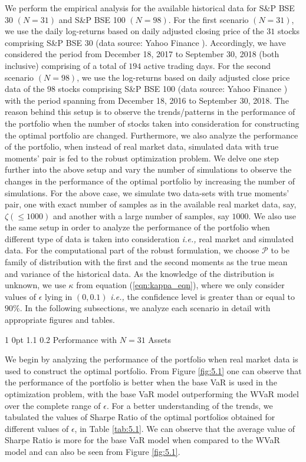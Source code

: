 \documentclass[12pt]{article}
\makeatletter
\numberwithin{equation}{section}
\renewcommand{\subsubsection}{
  \@startsection
  {subsubsection}%
  {1}%
  {0pt}%
  {1.1\baselineskip}%
  {0.2\baselineskip}%
  {\sc \centering}%
}
\makeatother
\begin{document}
We perform the empirical analysis for the available historical data for S\&P BSE 30 $(N=31)$ and S\&P BSE 100 $(N=98)$. For the first scenario $(N=31)$,
we use the daily log-returns based on daily adjusted closing price of the $31$ stocks comprising S\&P BSE 30 (data source: Yahoo Finance \cite{yf}).
Accordingly, we have considered the period from December 18, 2017 to September 30, 2018 (both inclusive) comprising of a total of $194$ active trading days.
For the second scenario $(N=98)$, we use the log-returns based on daily adjusted close price data of the $98$ stocks comprising S\&P BSE 100
(data source: Yahoo Finance \cite{yf}) with the period spanning from December 18, 2016 to September 30, 2018. The reason behind this setup is to observe the trends/patterns in the performance of the portfolio when the number of stocks taken into consideration for constructing the optimal portfolio are changed. Furthermore, we also analyze the performance of the portfolio, when instead of real market data, simulated data with true moments' pair is fed to the robust optimization problem. We delve one step further into the above setup and vary the number of simulations to observe the changes in the performance of the optimal portfolio by increasing the number of simulations. For the above case, we simulate two data-sets with true moments' pair, one with exact number of samples as in the available real market data, say, $\zeta(\leq 1000)$ and another with a large number of samples, say $1000$. We also use the same setup in order to analyze the performance of the portfolio when different type of data is taken into consideration \textit{i.e.,} real market and simulated data. For the computational part of the robust formulation, we choose $\mathcal{P}$ to be family of distribution with the first and the second moments as the true mean and variance of the historical data. As the knowledge of the distribution is unknown, we use $\kappa$ from equation (\ref{eqn:kappa_eqn}), where we only consider values of $\epsilon$ lying in $(0,0.1)$ \textit{i.e.,} the confidence level is greater than or equal to $90\%$. In the following subsections, we analyze each scenario in detail with appropriate figures and tables.

\subsubsection{Performance with $N=31$ Assets}

We begin by analyzing the performance of the portfolio when real market data is used to construct the optimal portfolio. From Figure \ref{fig:5.1} one can observe that the performance of the portfolio is better when the base VaR is used in the optimization problem, with the base VaR model outperforming the WVaR model over the complete range of $\epsilon$. For a better understanding of the trends, we tabulated the values of Sharpe Ratio of the optimal portfolios obtained for different values of $\epsilon$, in Table \ref{tab:5.1}. We can observe that the average value of Sharpe Ratio is more for the base VaR model when compared to
the WVaR model and can also be seen from Figure \ref{fig:5.1}.
\end{document}
